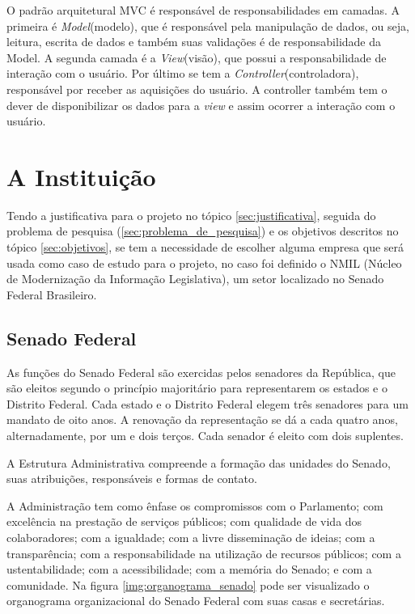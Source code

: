 O padrão arquitetural MVC é responsável de responsabilidades em camadas. A primeira é \textit{Model}(modelo), que é responsável pela manipulação de dados, ou seja, leitura, escrita de dados e também suas validações é de responsabilidade da Model. A segunda camada é a \textit{View}(visão), que possui a responsabilidade de interação com o usuário. Por último se tem a \textit{Controller}(controladora), responsável por receber as aquisições do usuário. A controller também tem o dever de disponibilizar os dados para a \textit{view} e assim ocorrer a interação com o usuário.

\section{A Instituição}

Tendo a justificativa para o projeto no tópico \ref{sec:justificativa}, seguida do problema de pesquisa (\ref{sec:problema_de_pesquisa}) e os objetivos descritos no tópico \ref{sec:objetivos}, se tem a necessidade de escolher alguma empresa que será usada como caso de estudo para o projeto, no caso foi definido o NMIL (Núcleo de Modernização da Informação Legislativa), um setor localizado no Senado Federal Brasileiro.

\subsection{Senado Federal}

As funções do Senado Federal são exercidas pelos senadores da República, que são eleitos segundo o princípio majoritário para representarem os estados e o Distrito Federal. Cada estado e o Distrito Federal elegem três senadores para um mandato de oito anos. A renovação da representação se dá a cada quatro anos, alternadamente, por um e dois terços. Cada senador é eleito com dois suplentes.

A Estrutura Administrativa compreende a formação das unidades do Senado, suas
atribuições, responsáveis e formas de contato.

A Administração tem como ênfase os compromissos com o Parlamento; com excelência na prestação de serviços públicos; com qualidade de vida dos colaboradores; com a igualdade; com a livre disseminação de ideias; com a transparência; com a responsabilidade na utilização
de recursos públicos; com a ustentabilidade; com a acessibilidade; com a memória do Senado; e com a comunidade. Na figura \ref{img:organograma_senado} pode ser visualizado o organograma organizacional do Senado Federal com suas casas e secretárias.

